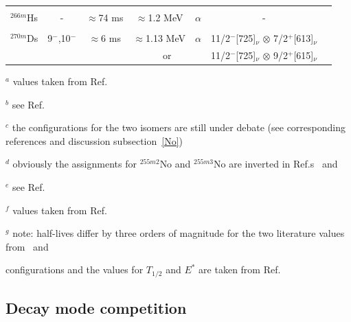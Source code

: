 \begin{center}
\begin{longtable}{lcccccl}
          &        &         &         &            &                & \cite{Rissanen2013}\\
$^{266m}$Hs& -      &$\approx$74 ms&$\approx$1.2 MeV&$\alpha$         &
				     -                                                & \cite{Ackermann2012}\\
          &        &         &         &            &                & \cite{Ackermann2015b}\\
$^{270m}$Ds& 9$^-$,10$^-$&$\approx$6 ms&$\approx$1.13 MeV&$\alpha$&
				     11/2$^-$[725]$_\nu$ $\otimes$ 7/2$^+$[613]$_\nu$ & \cite{Hofmann2001}\\
          &        &         &         \multicolumn{2}{c}{or}      &
                11/2$^-$[725]$_\nu$ $\otimes$ 9/2$^+$[615]$_\nu$ & \cite{Ackermann2015b}\\
\hline

\end{longtable}
\vspace{-0.3 cm}
\begin{tablenotes}\footnotesize
\item $^a$ values taken from Ref.~\cite{Kallunkathariyil2020}
\item $^b$ see Ref.~\cite{Antalic2011}
\item $^c$ the configurations for the two isomers are still under debate (see corresponding references and discussion subsection~\ref{No})
\item $^d$ obviously the assignments for $^{255m2}$No and $^{255m3}$No are inverted in Ref.s~\cite{Bronis2022} and \cite{Kessaci2022}
\item $^e$ see Ref.~\cite{Kessaci2021}
\item $^f$ values taken from Ref.~\cite{Jeppesen2009a}
\item $^g$ note: half-lives differ by three orders of magnitude for the two literature values from~\cite{Lopez-Martens2022} and \cite{Khuyagbaatar2021} 
\item[h]configurations and the values for $T_{1/2}$ and $E^*$ are taken from Ref.~\cite{Chakma2023}
\end{tablenotes}
\end{center}
\twocolumn

\subsection{Decay mode competition}\label{dec-comp}


